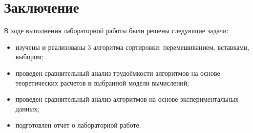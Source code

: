 \chapter*{Заключение}

В ходе выполнения лабораторной работы были решены следующие задачи:

\begin{itemize}
	\item изучены и реализованы 3 алгоритма сортировки: перемешиванием, вставками, выбором;
	\item проведен сравнительный анализ трудоёмкости алгоритмов на основе теоретических расчетов и выбранной модели вычислений;
	\item проведен сравнительный анализ алгоритмов на основе экспериментальных данных;
	\item подготовлен отчет о лабораторной работе.
\end{itemize}

